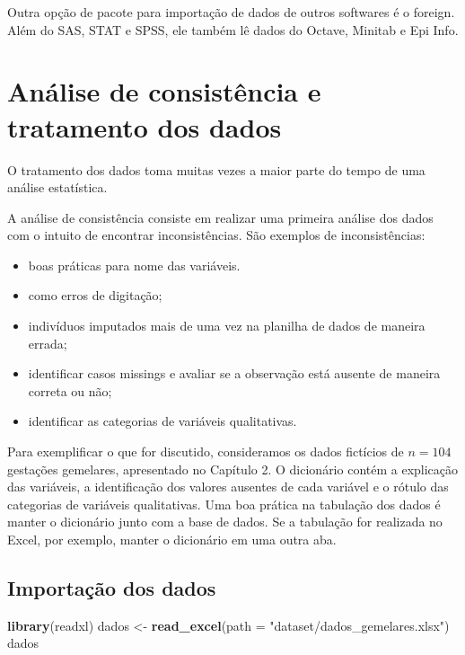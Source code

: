 \documentclass[
]{book}
\newenvironment{Shaded}{\begin{snugshade}}{\end{snugshade}}
\newcommand{\DataTypeTok}[1]{\textcolor[rgb]{0.13,0.29,0.53}{#1}}
\newcommand{\KeywordTok}[1]{\textcolor[rgb]{0.13,0.29,0.53}{\textbf{#1}}}
\newcommand{\NormalTok}[1]{#1}
\newcommand{\StringTok}[1]{\textcolor[rgb]{0.31,0.60,0.02}{#1}}
\providecommand{\tightlist}{%
  \setlength{\itemsep}{0pt}\setlength{\parskip}{0pt}}
\begin{document}
Outra opção de pacote para importação de dados de outros softwares é o foreign. Além do SAS, STAT e SPSS, ele também lê dados do Octave, Minitab e Epi Info.

\hypertarget{consistencia}{%
\section{Análise de consistência e tratamento dos dados}\label{consistencia}}

O tratamento dos dados toma muitas vezes a maior parte do tempo de uma análise estatística.

A análise de consistência consiste em realizar uma primeira análise dos dados com o intuito de encontrar inconsistências. São exemplos de inconsistências:

\begin{itemize}
\tightlist
\item
  boas práticas para nome das variáveis.
\item
  como erros de digitação;
\item
  indivíduos imputados mais de uma vez na planilha de dados de maneira errada;
\item
  identificar casos missings e avaliar se a observação está ausente de maneira correta ou não;
\item
  identificar as categorias de variáveis qualitativas.
\end{itemize}

Para exemplificar o que for discutido, consideramos os dados fictícios de \(n=104\) gestações gemelares, apresentado no Capítulo 2. O dicionário contém a explicação das variáveis, a identificação dos valores ausentes de cada variável e o rótulo das categorias de variáveis qualitativas. Uma boa prática na tabulação dos dados é manter o dicionário junto com a base de dados. Se a tabulação for realizada no Excel, por exemplo, manter o dicionário em uma outra aba.

\hypertarget{importauxe7uxe3o-dos-dados}{%
\subsection{Importação dos dados}\label{importauxe7uxe3o-dos-dados}}

\begin{Shaded}
\begin{Highlighting}[]
\KeywordTok{library}\NormalTok{(readxl)}
\NormalTok{dados <-}\StringTok{ }\KeywordTok{read_excel}\NormalTok{(}\DataTypeTok{path =} \StringTok{"dataset/dados_gemelares.xlsx"}\NormalTok{)}
\NormalTok{dados}
\end{Highlighting}
\end{Shaded}
\end{document}
